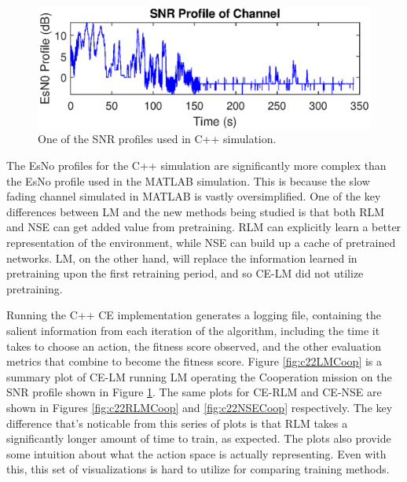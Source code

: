 \begin{figure}[ht]
\centering
\includegraphics[scale=1]{figures/c_sim_results/sim22_SNRProfile.eps}
\caption{One of the SNR profiles used in C++ simulation.}
\label{fig:cSimSNRProfile}
\end{figure}
\par The EsNo profiles for the C++ simulation are significantly more complex than the EsNo profile used in the MATLAB simulation. This is because the slow fading channel simulated in MATLAB is vastly oversimplified. One of the key differences between LM and the new methods being studied is that both RLM and NSE can get added value from pretraining. RLM can explicitly learn a better representation of the environment, while NSE can build up a cache of pretrained networks. LM, on the other hand, will replace the information learned in pretraining upon the first retraining period, and so CE-LM did not utilize pretraining. 
\par Running the C++ CE implementation generates a logging file, containing the salient information from each iteration of the algorithm, including the time it takes to choose an action, the fitness score observed, and the other evaluation metrics that combine to become the fitness score. Figure \ref{fig:c22LMCoop} is a summary plot of CE-LM running LM operating the Cooperation mission on the SNR profile shown in Figure \ref{fig:cSimSNRProfile}. The same plots for CE-RLM and CE-NSE are shown in Figures \ref{fig:c22RLMCoop} and \ref{fig:c22NSECoop} respectively. The key difference that's noticable from this series of plots is that RLM takes a significantly longer amount of time to train, as expected. The plots also provide some intuition about what the action space is actually representing. Even with this, this set of visualizations is hard to utilize for comparing training methods.
